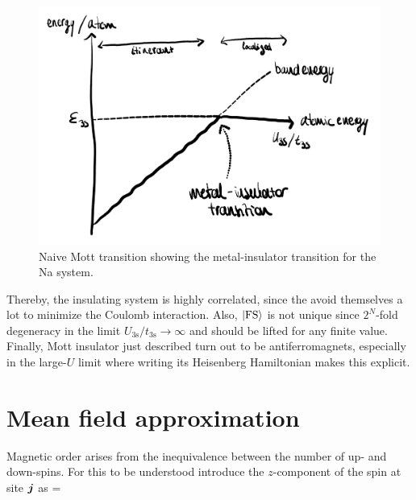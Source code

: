 		\begin{figure}[h!]
			\centering
			\includegraphics[scale=0.15]{graphs/transitionNa.png}
			\caption{Naive Mott transition showing the metal-insulator transition for the Na system.}
			\label{fig:transitionNa}
		\end{figure}

		Thereby, the insulating system is highly correlated, since the \electron avoid themselves a lot to minimize the Coulomb interaction. Also, $\ket{\text{FS}}$ is not unique since $2^N$-fold degeneracy in the limit $U_\text{3s}/t_\text{3s}\to \infty$ and should be lifted for any finite value. Finally, Mott insulator just described turn out to be antiferromagnets, especially in the large-$U$ limit where writing its Heisenberg Hamiltonian makes this explicit.

	\section{Mean field approximation}

		Magnetic order arises from the inequivalence between the number of up- and down-spins. For this to be understood introduce the $z$-component of the spin at site $\vb* j$ as
		\be {} =  \ee

